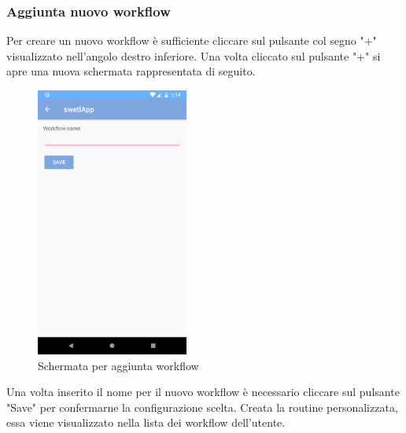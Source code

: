 \subsubsection{Aggiunta nuovo workflow}
\label{sec:sec_aggiunta_nuovo_workflow}
Per creare un nuovo workflow è sufficiente cliccare sul pulsante col segno "+" visualizzato nell'angolo destro inferiore.
Una volta cliccato sul pulsante "+" si apre una nuova schermata rappresentata di seguito.
\begin{figure}[H]
	\centering
	\includegraphics[width=5cm]{../includes/pics/add_workflow.png}
	\caption{\label{fig:add_workflow}Schermata per aggiunta workflow}
\end{figure}
Una volta inserito il nome per il nuovo workflow è necessario cliccare sul pulsante "Save" per confermarne la configurazione scelta. Creata la routine personalizzata, essa viene visualizzato nella lista dei workflow dell'utente.
